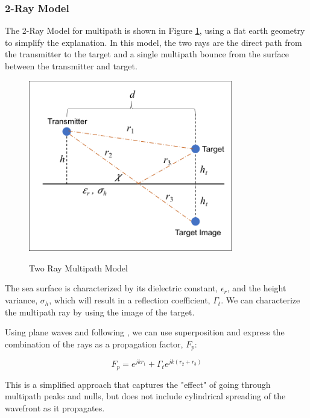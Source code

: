 \subsubsection{2-Ray Model}
The 2-Ray Model for multipath is shown in Figure \ref{env_fig:3}, using a flat earth geometry to simplify the explanation. In this model, the two rays are the direct path from the transmitter to the target and a single multipath bounce from the surface between the transmitter and target.

\begin{figure}[H]
  \begin{center}
\includegraphics[width=3.5in]{../media/multistatic/two_ray_multipath_model.png}
  \end{center}
  \renewcommand{\baselinestretch}{1} \small\normalsize
  \begin{quote}
    \caption[Two Ray Multipath Model]{Two Ray Multipath Model\label{env_fig:3}}
  \end{quote}
\end{figure}
\renewcommand{\baselinestretch}{2} \small\normalsize
The sea surface is characterized by its dielectric constant, $\epsilon_r$, and the height variance, $\sigma_h$, which will result in a reflection coefficient, $\Gamma_t$. We can characterize the multipath ray by using the image of the target.

Using plane waves and following \cite{lohrmann_rcs}, we can use superposition and express the combination of the rays as a propagation factor, $F_p$:

  \begin{equation}
  \label{env_eq:3b}
F_p = e^{jkr_1} + \Gamma_te^{jk\left(r_2 + r_3\right)}
\end{equation}
\renewcommand{\baselinestretch}{2} \small\normalsize

This is a simplified approach that captures the "effect" of going through multipath peaks and nulls, but does not include cylindrical spreading of the wavefront as it propagates.

